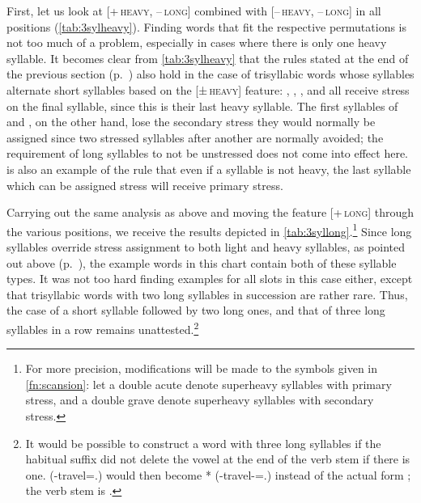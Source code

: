 First, let us look at \textsc{[+\,heavy, –\,long]} combined with
\textsc{[–\,heavy, –\,long]} in all positions (\autoref{tab:3sylheavy}).
Finding words that fit the respective permutations is not too much of a
problem, especially in cases where there is only one heavy syllable. It becomes
clear from \autoref{tab:3sylheavy} that the rules stated at the end of the
previous section (p.~\pageref{2sylsumm}) also hold in the case of trisyllabic
words whose syllables alternate short syllables based on the
\textsc{[±\,heavy]} feature: ,
, , and 
 all receive stress on the final syllable, since
this is their last heavy syllable. The first syllables of
 and , on the other hand,
lose the secondary stress they would normally be assigned since two stressed
syllables after another are normally avoided; the requirement of long syllables
to not be unstressed does not come into effect here. 
is also an example of the rule that even if a syllable is not heavy, the last
syllable which can be assigned stress will receive primary stress.

Carrying out the same analysis as above and moving the feature
\textsc{[+\,long]} through the various positions, we receive the results
depicted in \autoref{tab:3syllong}.\footnote{For more precision, modifications
will be made to the symbols given in \autoref{fn:scansion}: let a double acute
 denote superheavy syllables with primary stress, and a double grave
 denote superheavy syllables with secondary stress.} Since
long syllables override stress assignment to both light and heavy syllables, as
pointed out above (p.~\pageref{2sylsumm}), the example words in this chart
contain both of these syllable types. It was not too hard finding examples for
all slots in this case either, except that trisyllabic words with two long
syllables in succession are rather rare. Thus, the case of a short syllable
followed by two long ones, and that of three long syllables in a row remains
unattested.\footnote{It would be possible to construct a word with three long
syllables if the habitual suffix  did not delete the vowel at
the end of the verb stem if there is one. 
(\Pst{}-travel=\Fsg{}.\Top{}) would then become * (\Pst{}-travel-\Hab{}=\Fsg{}.\Top{}) instead of the actual form
; the verb stem is .}

